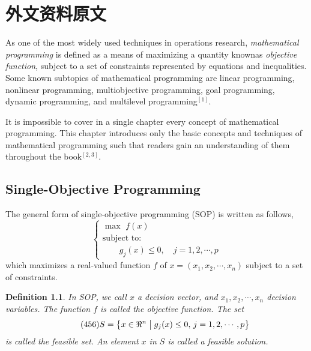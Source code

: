 % 
% 
% 
% 
% 
% 

\chapter{外文资料原文}
\label{chapter:engorg}

As one of the most widely used techniques in operations research,
{\em mathematical programming} is defined as a means of maximizing a quantity knownas {\em objective function},
subject to a set of constraints represented by equations and inequalities.
Some known subtopics of mathematical programming are linear programming,
nonlinear programming, multiobjective programming,
goal programming,
dynamic programming,
and multilevel programming$^{[1]}$.

It is impossible to cover in a single chapter every concept of mathematical programming.
This chapter introduces only the basic concepts and techniques of mathematical programming such that readers gain an understanding of them throughout the book$^{[2,3]}$.


\section{Single-Objective Programming}
The general form of single-objective programming (SOP) is written as follows,
\begin{equation}\tag*{(123)} %
\left\{\begin{array}{l}
\max \,\,f(x)\\[0.1 cm]
\mbox{subject to:} \\ [0.1 cm]
\qquad g_j(x)\le 0,\quad j=1,2,\cdots,p
\end{array}\right.
\end{equation}
which maximizes a real-valued function $f$ of $x=(x_1,x_2,\cdots,x_n)$ subject to a set of constraints.

\newtheorem{mpdef}{Definition}[chapter]
\begin{mpdef}
In SOP, we call $x$ a decision vector, and $x_1,x_2,\cdots,x_n$ decision variables.
The function $f$ is called the objective function. The set
\begin{equation}\tag*{(456)} %
S=\left\{x\in\Re^n\bigm|g_j(x)\le 0,\,j=1,2,\cdots,p\right\}
\end{equation}
is called the feasible set. An element $x$ in $S$ is called a feasible solution.
\end{mpdef}

